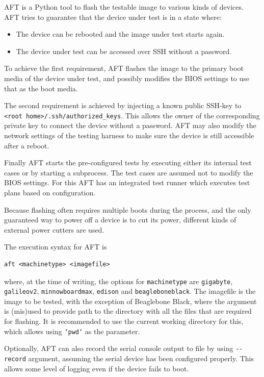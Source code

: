 \documentclass[a4paper,11pt]{article}
\newcommand{\cmd}[1]{\texttt{#1}}
\begin{document}
AFT is a Python tool to flash the testable image to various kinds of devices.  AFT tries to guarantee that the device under test is in a state where:
\begin{itemize}
\item The device can be rebooted and the image under test starts again.
\item The device under test can be accessed over SSH without a password.
\end{itemize}

To achieve the first requirement, AFT flashes the image to the primary boot media of the device under test, and possibly modifies the BIOS settings to use that as the boot media.

The second requirement is achieved by injecting a known public SSH-key to \linebreak\cmd{<root home>/.ssh/authorized\_keys}. This allows the owner of the corresponding private key to connect the device without a password. AFT may also modify the network settings of the testing harness to make sure the device is still accessible after a reboot.

Finally AFT starts the pre-configured tests by executing either its internal test cases or by starting a subprocess. The test cases are assumed not to modify the BIOS settings. For this AFT has an integrated test runner which executes test plans based on configuration.

Because flashing often requires multiple boots during the process, and the only guaranteed way to power off a device is to cut its power, different kinds of external power cutters are used.

The execution syntax for AFT is
\begin{lstlisting}
aft <machinetype> <imagefile>
\end{lstlisting}
where, at the time of writing, the options for  \cmd{machinetype} are \cmd{gigabyte}, \cmd{galileov2}, \cmd{minnowboardmax}, \cmd{edison} and \cmd{beagleboneblack}. The imagefile is the image to be tested, with the exception of Beaglebone Black, where the argument is (mis)used to provide path to the directory with all the files that are required for flashing. It is recommended to use the current working directory for this, which allows using \cmd{`pwd`} as the parameter.

Optionally, AFT can also record the serial console output to file by using \cmd{-\/-record} argument, assuming the serial device has been configured properly. This allows some level of logging even if the device fails to boot.
\end{document}
